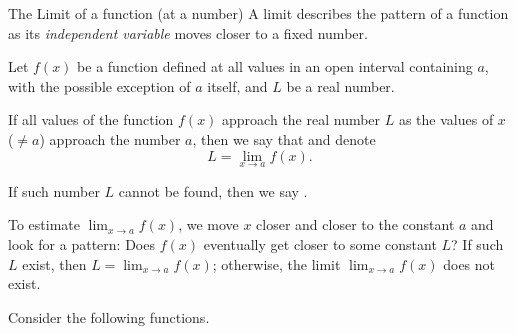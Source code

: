 \documentclass[../main.tex]{subfiles}
\begin{document}
\begin{lesson}{The Limit of a function (at a number)}
  A limit describes the pattern of a function as its \emph{independent variable} moves closer to a fixed number.

  \begin{mdframed}[style=withref-compact]
    Let \(f(x)\) be a function defined at all values in an open interval containing \(a\), with the possible exception of \(a\) itself, and \(L\) be a real number. 

    If all values of the function \(f(x)\) approach the real number \(L\) as the values of \(x\) (\(\ne a\)) approach the number \(a\), then we say that  and denote
    \[
      L = \lim_{x \to a} f(x).
    \]

    If such number \(L\) cannot be found, then we say .

  \end{mdframed}

  \faLightbulb{} To estimate \(\lim_{x \to a} f(x)\), we move \(x\) closer and closer to the constant \(a\) \underline{\hspace{6cm}} and look for a pattern: Does \(f(x)\) eventually get \underline{\hspace{3cm}} closer to some constant \(L\)? If such \(L\) exist, then \(L = \lim_{x \to a} f(x)\); otherwise, the limit \(\lim_{x \to a}f(x)\) does not exist.

  \begin{example}
    Consider the following functions.



\end{example}
\end{lesson}
\end{document}
